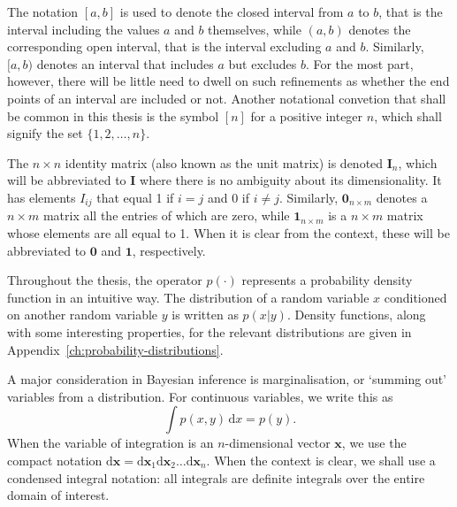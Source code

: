 \begin{mccorrection}
The notation $[a, b]$ is used to denote the closed interval from $a$ to $b$, that is the interval including the values $a$ and $b$ themselves, while $(a, b)$ denotes the corresponding open interval, that is the interval excluding $a$ and $b$. Similarly, $[a, b)$ denotes an interval that includes $a$ but excludes $b$. For the most part, however, there will be little need to dwell on such refinements as whether the end points of an interval are included or not. Another notational convetion that shall be common in this thesis is the symbol $[n]$ for a positive integer $n$, which shall signify the set $\{1, 2, \ldots, n\}$.
\end{mccorrection}

The $n \times n$ identity matrix (also known as the unit matrix) is denoted $\mathbf{I}_n$, which will be abbreviated to $\mathbf{I}$ where there is no ambiguity about its dimensionality.
It has elements $I_{ij}$ that equal 1 if $i = j$ and 0 if $i \neq j$. Similarly, $\mathbf{0}_{n \times m}$ denotes a $n \times m$ matrix all the entries of which are zero, while $\mathbf{1}_{n \times m}$ is a $n \times m$ matrix whose elements are all equal to 1. When it is clear from the context, these will be abbreviated to $\mathbf{0}$ and $\mathbf{1}$, respectively.

Throughout the thesis, the operator $p(\cdot)$ represents a probability density function in an intuitive way. The distribution of a random variable $x$ conditioned on another random variable $y$ is written as $p(x|y)$. Density functions, along with some interesting properties, for the relevant distributions are given in Appendix~\ref{ch:probability-distributions}.

A major consideration in Bayesian inference is marginalisation, or `summing out' variables from a distribution. For continuous variables, we write this as
\begin{equation}
	\int p(x, y) \, \mathrm{d}x = p(y).
\end{equation}
When the variable of integration is an $n$-dimensional vector $\mathbf{x}$, we use the compact notation $\mathrm{d}\mathbf{x} = \mathrm{d}\mathbf{x}_1 \mathrm{d}\mathbf{x}_2 \ldots \mathrm{d}\mathbf{x}_n$. When the context is clear, we shall use a condensed integral notation: all integrals are definite integrals over the entire domain of interest.

